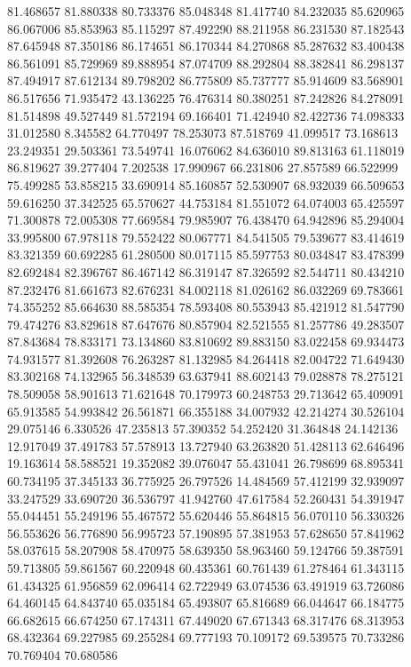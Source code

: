 81.468657
81.880338
80.733376
85.048348
81.417740
84.232035
85.620965
86.067006
85.853963
85.115297
87.492290
88.211958
86.231530
87.182543
87.645948
87.350186
86.174651
86.170344
84.270868
85.287632
83.400438
86.561091
85.729969
89.888954
87.074709
88.292804
88.382841
86.298137
87.494917
87.612134
89.798202
86.775809
85.737777
85.914609
83.568901
86.517656
71.935472
43.136225
76.476314
80.380251
87.242826
84.278091
81.514898
49.527449
81.572194
69.166401
71.424940
82.422736
74.098333
31.012580
8.345582
64.770497
78.253073
87.518769
41.099517
73.168613
23.249351
29.503361
73.549741
16.076062
84.636010
89.813163
61.118019
86.819627
39.277404
7.202538
17.990967
66.231806
27.857589
66.522999
75.499285
53.858215
33.690914
85.160857
52.530907
68.932039
66.509653
59.616250
37.342525
65.570627
44.753184
81.551072
64.074003
65.425597
71.300878
72.005308
77.669584
79.985907
76.438470
64.942896
85.294004
33.995800
67.978118
79.552422
80.067771
84.541505
79.539677
83.414619
83.321359
60.692285
61.280500
80.017115
85.597753
80.034847
83.478399
82.692484
82.396767
86.467142
86.319147
87.326592
82.544711
80.434210
87.232476
81.661673
82.676231
84.002118
81.026162
86.032269
69.783661
74.355252
85.664630
88.585354
78.593408
80.553943
85.421912
81.547790
79.474276
83.829618
87.647676
80.857904
82.521555
81.257786
49.283507
87.843684
78.833171
73.134860
83.810692
89.883150
83.022458
69.934473
74.931577
81.392608
76.263287
81.132985
84.264418
82.004722
71.649430
83.302168
74.132965
56.348539
63.637941
88.602143
79.028878
78.275121
78.509058
58.901613
71.621648
70.179973
60.248753
29.713642
65.409091
65.913585
54.993842
26.561871
66.355188
34.007932
42.214274
30.526104
29.075146
6.330526
47.235813
57.390352
54.252420
31.364848
24.142136
12.917049
37.491783
57.578913
13.727940
63.263820
51.428113
62.646496
19.163614
58.588521
19.352082
39.076047
55.431041
26.798699
68.895341
60.734195
37.345133
36.775925
26.797526
14.484569
57.412199
32.939097
33.247529
33.690720
36.536797
41.942760
47.617584
52.260431
54.391947
55.044451
55.249196
55.467572
55.620446
55.864815
56.070110
56.330326
56.553626
56.776890
56.995723
57.190895
57.381953
57.628650
57.841962
58.037615
58.207908
58.470975
58.639350
58.963460
59.124766
59.387591
59.713805
59.861567
60.220948
60.435361
60.761439
61.278464
61.343115
61.434325
61.956859
62.096414
62.722949
63.074536
63.491919
63.726086
64.460145
64.843740
65.035184
65.493807
65.816689
66.044647
66.184775
66.682615
66.674250
67.174311
67.449020
67.671343
68.317476
68.313953
68.432364
69.227985
69.255284
69.777193
70.109172
69.539575
70.733286
70.769404
70.680586
